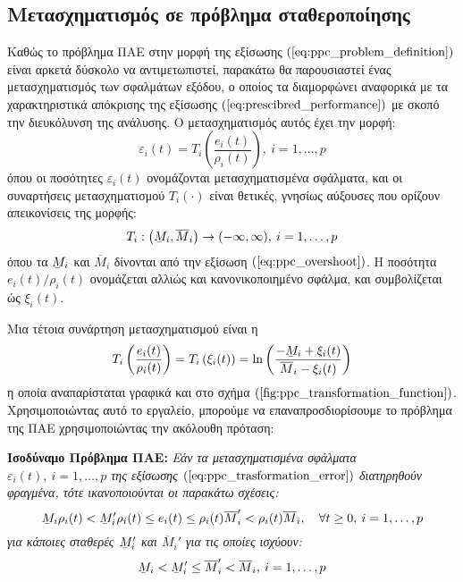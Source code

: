\subsection{Μετασχηματισμός σε πρόβλημα σταθεροποίησης}
Καθώς το πρόβλημα ΠΑΕ στην μορφή της εξίσωσης $(\ref{eq:ppc_problem_definition})$ είναι αρκετά δύσκολο να αντιμετωπιστεί, παρακάτω θα παρουσιαστεί ένας μετασχηματισμός των σφαλμάτων εξόδου, ο οποίος τα διαμορφώνει αναφορικά με τα χαρακτηριστικά απόκρισης της εξίσωσης $(\ref{eq:prescibred_performance})$ με σκοπό την διευκόλυνση της ανάλυσης. Ο μετασχηματισμός αυτός έχει την μορφή:
\begin{equation}
	\varepsilon_i(t) = T_i \left( \frac{e_i(t)}{\rho_i(t)} \right)
	, \: i = 1,\dots ,p
	\label{eq:ppc_trasformation_error}
\end{equation}
όπου οι ποσότητες $\varepsilon_i(t)$ ονομάζονται μετασχηματισμένα σφάλματα, και οι συναρτήσεις μετασχηματισμού $T_i(\cdot)$ είναι θετικές, γνησίως αύξουσες που ορίζουν απεικονίσεις της μορφής:
\begin{equation*}
	T_i: \left( \barbelow{M}_i, \overline{M}_i\right) \rightarrow 
	(- \infty, \infty), \: i = 1,\dots ,p
\end{equation*}
όπου τα $\barbelow{M}_i$ και  $\overline{M}_i$ δίνονται από την εξίσωση $(\ref{eq:ppc_overshoot})$. Η ποσότητα $e_i(t)/\rho_i(t)$ ονομάζεται αλλιώς και κανονικοποιημένο σφάλμα, και συμβολίζεται ώς $\xi_i(t)$.

Μια τέτοια συνάρτηση μετασχηματισμού είναι η
\begin{equation}
	T_i \left( \frac{e_i(t)}{\rho_i(t)} \right) = T_i \left( \xi_i(t) \right) =
	\ln \left( \frac{-\barbelow{M}_i + \xi_i(t) }{\overline{M}_i - \xi_i(t)} \right)
	\label{eq:ppc_log_transform}
\end{equation}
η οποία αναπαρίσταται γραφικά και στο σχήμα $(\ref{fig:ppc_transformation_function})$. Χρησιμοποιώντας αυτό το εργαλείο, μπορούμε να επαναπροσδιορίσουμε το πρόβλημα της ΠΑΕ χρησιμοποιώντας την ακόλουθη πρόταση:

\textbf{Ισοδύναμο Πρόβλημα ΠΑΕ:}
\textit{ Εάν τα μετασχηματισμένα σφάλματα $\varepsilon_i(t), \: i = 1,\dots ,p$ της εξίσωσης $(\ref{eq:ppc_trasformation_error})$ διατηρηθούν φραγμένα, τότε ικανοποιούνται οι παρακάτω σχέσεις:
\begin{equation*}
\barbelow{M}_i \rho_i(t) < \barbelow{M}_i' \rho_i(t) \leq e_i(t) \leq \rho_i(t) \overline{M}_i' < \rho_i(t) \overline{M}_i, \quad \forall t \geq 0, \: i = 1,\dots ,p
\end{equation*}
για κάποιες σταθερές $\barbelow{M}_i'$ και $\overline{M}_i'$ για τις οποίες ισχύουν:
\begin{equation}
\barbelow{M}_i < \barbelow{M}_i' \leq \overline{M}_i' < \overline{M}_i, \: i = 1,\dots ,p
\end{equation}
\label{eq:overshoot_bounds}
}

